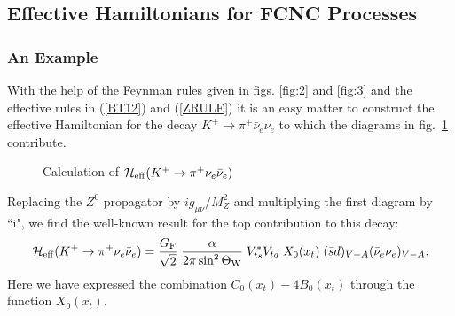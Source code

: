 \documentclass[12pt,rotate]{article}
\begin{document}
\begin{itemize}
\subsection{Effective Hamiltonians for FCNC Processes}
\subsubsection{An Example}
With the help of the Feynman rules given in figs. \ref{fig:2} and 
\ref{fig:3} and the effective rules in 
(\ref{BT12}) and (\ref{ZRULE}) 
it is an easy
matter to construct the effective Hamiltonian for 
the decay $K^+\to \pi^+\bar\nu_e\nu_e$ to which
the diagrams in fig.\ \ref{fig:9} contribute. 
\begin{figure}[hbt]
\centerline{
\epsfysize=1.6in
}
\caption[]{
Calculation of ${\cal H}_{\rm eff}(K^+\to\pi^+\nu_e\bar\nu_e)$
\label{fig:9}}
\end{figure}

Replacing the $Z^0$ propagator by $i g_{\mu\nu}/M_Z^2$
and multiplying the first diagram 
by ``i", we
find the well-known result for the top contribution to this decay:
\begin{equation}\label{kplus}
{\cal H}_{\rm eff}(K^+\to\pi^+\nu_e\bar\nu_e) = {{G_{\rm F}}\over{\sqrt2}}\;
{{\alpha}\over{2\pi\sin^2\Theta_{\rm W}}}\; V_{ts}^* V_{td}\; 
X_0(x_t)\;
(\bar
s d)_{V-A} (\bar\nu_e\nu_e)_{V-A}.
\end{equation}
Here we have expressed the combination $C_0(x_t)-4 B_0(x_t)$ through
the function $X_0(x_t)$.


\end{itemize}
\end{document}
